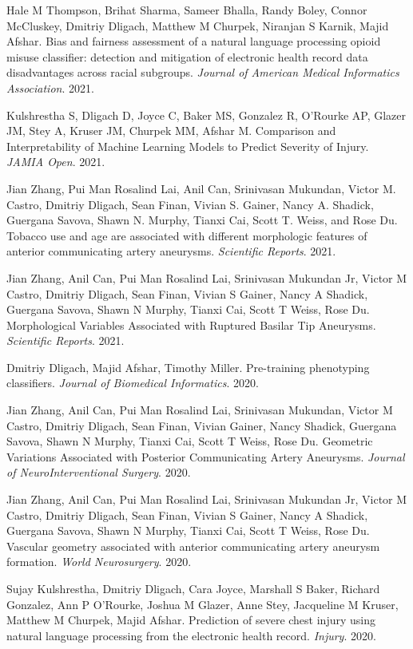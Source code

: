 \documentclass[letterpaper]{article}
\renewenvironment{itemize}{
  \begin{list}{}{
    \setlength{\leftmargin}{1.5em}
  }
}{
  \end{list}
}
\begin{document}
\begin{itemize}
\item Hale M Thompson, Brihat Sharma, Sameer Bhalla, Randy Boley, Connor McCluskey, Dmitriy Dligach, Matthew M Churpek, Niranjan S Karnik, Majid Afshar. Bias and fairness assessment of a natural language processing opioid misuse classifier: detection and mitigation of electronic health record data disadvantages across racial subgroups. \emph{Journal of American Medical Informatics Association}. 2021.
\item Kulshrestha S, Dligach D, Joyce C, Baker MS, Gonzalez R, O’Rourke AP, Glazer JM, Stey A, Kruser JM, Churpek MM, Afshar M. Comparison and Interpretability of Machine Learning Models to Predict Severity of Injury. \emph{JAMIA Open}. 2021.
\item Jian Zhang, Pui Man Rosalind Lai, Anil Can, Srinivasan Mukundan, Victor M. Castro, Dmitriy Dligach, Sean Finan, Vivian S. Gainer, Nancy A. Shadick, Guergana Savova, Shawn N. Murphy, Tianxi Cai, Scott T. Weiss, and Rose Du. Tobacco use and age are associated with different morphologic features of anterior communicating artery aneurysms. \emph{Scientific Reports}. 2021.
\item Jian Zhang, Anil Can, Pui Man Rosalind Lai, Srinivasan Mukundan Jr, Victor M Castro, Dmitriy Dligach, Sean Finan, Vivian S Gainer, Nancy A Shadick, Guergana Savova, Shawn N Murphy, Tianxi Cai, Scott T Weiss, Rose Du. Morphological Variables Associated with Ruptured Basilar Tip Aneurysms. \emph{Scientific Reports}. 2021.
\item Dmitriy Dligach, Majid Afshar, Timothy Miller. Pre-training phenotyping classifiers. \emph{Journal of Biomedical Informatics}. 2020.
\item Jian Zhang, Anil Can, Pui Man Rosalind Lai, Srinivasan Mukundan, Victor M Castro, Dmitriy Dligach, Sean Finan, Vivian Gainer, Nancy Shadick, Guergana Savova, Shawn N Murphy, Tianxi Cai, Scott T Weiss, Rose Du. Geometric Variations Associated with Posterior Communicating Artery Aneurysms. \emph{Journal of NeuroInterventional Surgery}. 2020.
\item Jian Zhang, Anil Can, Pui Man Rosalind Lai, Srinivasan Mukundan Jr, Victor M Castro, Dmitriy Dligach, Sean Finan, Vivian S Gainer, Nancy A Shadick, Guergana Savova, Shawn N Murphy, Tianxi Cai, Scott T Weiss, Rose Du. Vascular geometry associated with anterior communicating artery aneurysm formation. \emph{World Neurosurgery}. 2020.
\item Sujay Kulshrestha, Dmitriy Dligach, Cara Joyce, Marshall S Baker, Richard Gonzalez, Ann P O'Rourke, Joshua M Glazer, Anne Stey, Jacqueline M Kruser, Matthew M Churpek, Majid Afshar. Prediction of severe chest injury using natural language processing from the electronic health record. \emph{Injury}. 2020.

\end{itemize}
\end{document}
